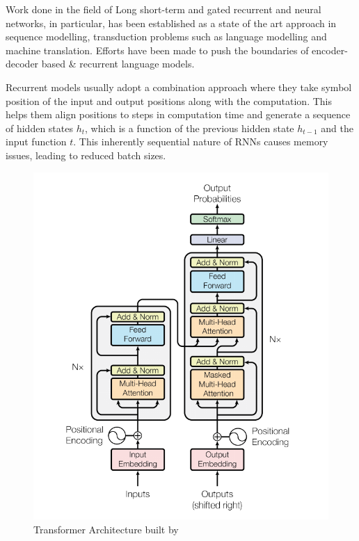 \documentclass[a4paper,12pt]{report}
\begin{document}
	        Work done in the field of Long short-term and gated recurrent \citep{lstmoriginal} and \citep{recurrent} neural networks, in particular, has been established as a state of the art approach in sequence modelling, transduction problems such as language modelling and machine translation.  Efforts have been made to push the boundaries of encoder-decoder based \& recurrent language models.

	        Recurrent models usually adopt a combination approach where they take symbol position of the input and output positions along with the computation. This helps them align positions to steps in computation time and generate a sequence of hidden states $ h_{t} $, which is a function of the previous hidden state $ h_{t-1}$ and the input function $ t $.  This inherently sequential nature of RNNs causes memory issues, leading to reduced batch sizes. \\
			\begin{figure}[h!]
				\centering
				\includegraphics[scale=0.4]{../images/transformer.png}
				\caption{Transformer Architecture built by \citep{atayl}}\label{transformerArchitecture}
			\end{figure}
\end{document}
